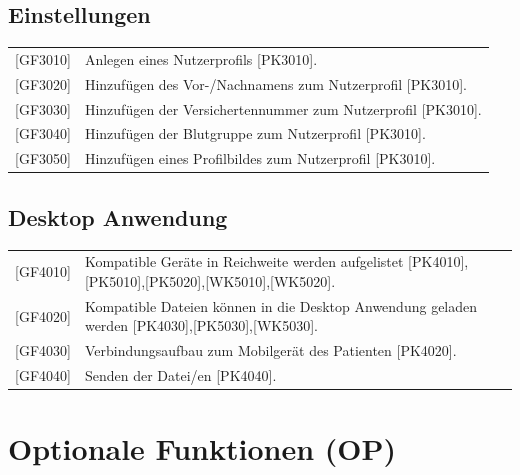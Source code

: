 \documentclass[a4paper]{scrreprt}
\begin{document}
\subsection{Einstellungen}
\begin{tabular}{lll}
[GF3010]&  \multicolumn{2}{p{12cm}}{Anlegen eines Nutzerprofils [PK3010].}\\
{[GF3020]} &  \multicolumn{2}{p{12cm}}{Hinzufügen des Vor-/Nachnamens zum Nutzerprofil [PK3010].}  \\
{[GF3030]} &  \multicolumn{2}{p{12cm}}{Hinzufügen der Versichertennummer zum Nutzerprofil [PK3010].}  \\
{[GF3040]} &  \multicolumn{2}{p{12cm}}{Hinzufügen der Blutgruppe zum Nutzerprofil [PK3010].}  \\
{[GF3050]} &  \multicolumn{2}{p{12cm}}{Hinzufügen eines Profilbildes zum Nutzerprofil [PK3010].}  \\
\end{tabular}

\subsection{\gls{Desktop Anwendung}}
\begin{tabular}{lll}
[GF4010]&  \multicolumn{2}{p{12cm}}{Kompatible Geräte in Reichweite werden aufgelistet [PK4010],[PK5010],[PK5020],[WK5010],[WK5020].}\\
{[GF4020]} &  \multicolumn{2}{p{12cm}}{Kompatible Dateien können in die Desktop Anwendung geladen werden [PK4030],[PK5030],[WK5030].}  \\
{[GF4030]} &  \multicolumn{2}{p{12cm}}{Verbindungsaufbau zum Mobilgerät des Patienten [PK4020].}  \\
{[GF4040]} &  \multicolumn{2}{p{12cm}}{Senden der Datei/en [PK4040].}  \\
\end{tabular}

\section{Optionale Funktionen (OP)}
\end{document}

